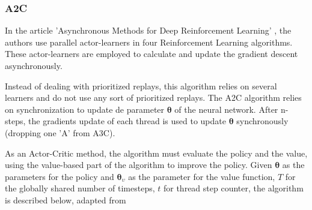 \documentclass[11pt,twoside,a4paper]{article}
\begin{document}
\subsubsection*{A2C}

In the article 'Asynchronous Methods for Deep Reinforcement Learning'
\cite{DBLP:journals/corr/MnihBMGLHSK16}, the authors use parallel actor-learners
in four Reinforcement Learning algorithms. These actor-learners are employed to
calculate and update the gradient descent asynchronously.

Instead of dealing with prioritized replays, this algorithm relies on several
learners and do not use any sort of prioritized replays. The A2C algorithm
relies on synchronization to update de parameter $ \boldsymbol{\theta} $ of the
neural network. After n-steps, the gradients update of each thread is used
to update $ \boldsymbol{\theta} $ synchronously (dropping one 'A' from A3C).

As an Actor-Critic method, the algorithm must evaluate the policy and the value,
using the value-based part of the algorithm to improve the policy. Given
$ \boldsymbol{\theta} $ as the parameters for the policy and
$ \boldsymbol{\theta}_{\upsilon} $ as the parameter for the value function, $T$
for the globally shared number of timesteps, $ t $ for thread step counter, the
algorithm is described below, adapted from \cite{DBLP:journals/corr/MnihBMGLHSK16}

\newpage
\end{document}

